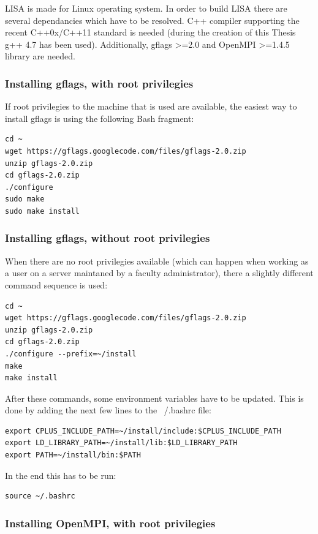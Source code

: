 \documentclass[times, utf8, diplomski]{fer}
\begin{document}
LISA is made for Linux operating system. In order to build LISA there are several dependancies which have to be resolved. C++ compiler supporting the recent C++0x/C++11 standard is needed (during the creation of this Thesis g++ 4.7 has been used). Additionally, gflags >=2.0 and OpenMPI >=1.4.5 library are needed.

\subsubsection{Installing gflags, with root privilegies}

If root privilegies to the machine that is used are available, the easiest way to install gflags is using the following Bash fragment:

\begin{lstlisting}
cd ~
wget https://gflags.googlecode.com/files/gflags-2.0.zip
unzip gflags-2.0.zip
cd gflags-2.0.zip
./configure
sudo make
sudo make install
\end{lstlisting}

\subsubsection{Installing gflags, without root privilegies}
When there are no root privilegies available (which can happen when working as a user on a server maintaned by a faculty administrator), there a slightly different command sequence is used:
\begin{lstlisting}
cd ~
wget https://gflags.googlecode.com/files/gflags-2.0.zip
unzip gflags-2.0.zip
cd gflags-2.0.zip
./configure --prefix=~/install
make
make install
\end{lstlisting}
After these commands, some environment variables have to be updated. This is done by adding the next few lines to the ~/.bashrc file:
\begin{lstlisting}
export CPLUS_INCLUDE_PATH=~/install/include:$CPLUS_INCLUDE_PATH
export LD_LIBRARY_PATH=~/install/lib:$LD_LIBRARY_PATH
export PATH=~/install/bin:$PATH
\end{lstlisting}
In the end this has to be run:
\begin{lstlisting}
source ~/.bashrc
\end{lstlisting}

\subsubsection{Installing OpenMPI, with root privilegies}
\end{document}
